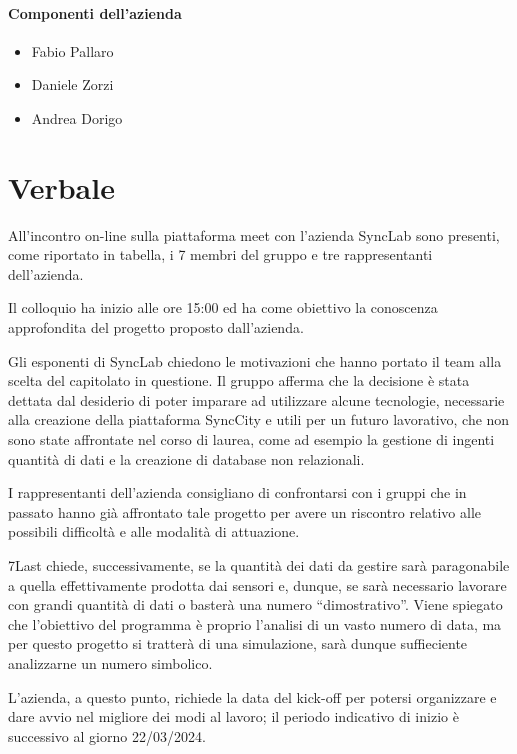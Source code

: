 \documentclass[italian,12pt]{article} %
\begin{document}
\paragraph{Componenti dell'azienda}

\begin{itemize}
	\item Fabio Pallaro
	\item Daniele Zorzi
	\item Andrea Dorigo
\end{itemize}

\newpage

\section{Verbale}
\begin{flushleft}

All’incontro on-line sulla piattaforma meet con l’azienda SyncLab sono presenti, 
come riportato in tabella, i 7 membri del gruppo e tre rappresentanti dell’azienda.

Il colloquio ha inizio alle ore 15:00 ed ha come obiettivo la conoscenza approfondita del progetto proposto dall’azienda.

Gli esponenti di SyncLab chiedono le motivazioni che hanno portato il team alla scelta del capitolato in questione.  
Il gruppo afferma che la decisione è stata dettata dal desiderio di poter  imparare ad utilizzare alcune tecnologie, 
necessarie alla creazione della piattaforma SyncCity e utili per un futuro lavorativo, che non sono state affrontate 
nel corso di laurea, come ad esempio la gestione di ingenti quantità di dati e la creazione di database non relazionali.

I rappresentanti dell’azienda consigliano di confrontarsi con i gruppi che in passato hanno già affrontato tale progetto per avere un 
riscontro relativo alle possibili difficoltà e alle modalità di attuazione.

7Last chiede, successivamente, se la quantità dei dati da gestire sarà paragonabile a quella effettivamente prodotta dai sensori e, dunque, 
se sarà necessario lavorare con grandi quantità di dati o basterà una numero “dimostrativo”. Viene spiegato che l’obiettivo del programma 
è proprio l’analisi di un vasto numero di data, ma per questo progetto si tratterà di una simulazione, sarà dunque suffieciente 
analizzarne un numero simbolico.

L’azienda, a questo punto, richiede la data del kick-off per potersi organizzare e dare avvio  nel migliore dei modi al lavoro; 
il periodo indicativo di inizio è successivo al giorno 22/03/2024.


\end{flushleft}
\end{document}
